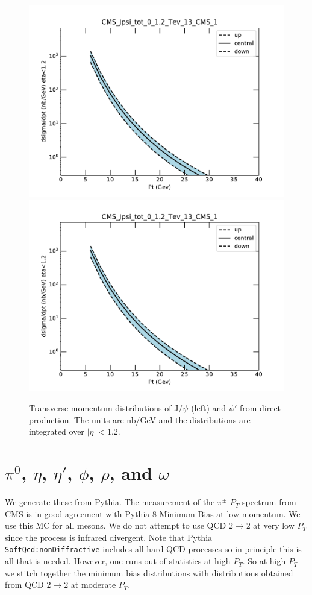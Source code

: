 \documentclass[12pt]{article}
\begin{document}
\begin{figure}
  \includegraphics[width=0.48\linewidth]{../oniaDirect/CMS-13-TeV/theory/CMS-Jpsi-tot-0-12-Tev-13-CMS-1.pdf}  
\includegraphics[width=0.48\linewidth]{../oniaDirect/CMS-13-TeV/theory/CMS-Jpsi-tot-0-12-Tev-13-CMS-1.pdf}  
  \caption{Transverse momentum distributions of J/$\psi$ (left) 
and $\psi'$ from direct production. The units are nb/GeV and the
distributions
are integrated over $|\eta|<1.2$.}
  \label{fig:ma}
\end{figure}




\section{$\pi^0$, $\eta$, $\eta'$, $\phi$, $\rho$, and $\omega$}
\label{sec:mesons}

We generate these from Pythia.  The measurement of the 
$\pi^{\pm}$
$P_T$ spectrum from CMS\cite{Sirunyan:2017zmn} is in good agreement
with Pythia 8 Minimum Bias at low momentum.  We use this MC for all
mesons.  We do not attempt to use QCD $2 \to 2$ at very low $P_T$ since the 
process is infrared divergent.
Note that Pythia {\tt SoftQcd:nonDiffractive} includes all
hard QCD processes\cite{wwwPythia} so in principle this is all that is
needed.    However, one runs out of statistics at high $P_T$.  So 
at high $P_T$ we stitch together the minimum bias distributions with 
distributions obtained from QCD $2 \to 2$ at moderate $P_T$.
\end{document}
